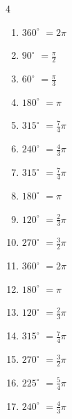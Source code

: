 \begin{multicols}{4}
\begin{enumerate}
\columnbreak %

  \item $\displaystyle 360^{\circ}$
        $\displaystyle =2\pi$

  \item $\displaystyle 90^{\circ}$
        $\displaystyle =\frac{\pi}{2}$

  \item $\displaystyle 60^{\circ}$
        $\displaystyle =\frac{\pi}{3}$

  \item $\displaystyle 180^{\circ}$
        $\displaystyle =\pi$

  \item $\displaystyle 315^{\circ}$
        $\displaystyle =\frac{7}{4}\pi$

  \item $\displaystyle 240^{\circ}$
        $\displaystyle =\frac{4}{3}\pi$

  \item $\displaystyle 315^{\circ}$
        $\displaystyle =\frac{7}{4}\pi$

  \item $\displaystyle 180^{\circ}$
        $\displaystyle =\pi$

  \item $\displaystyle 120^{\circ}$
        $\displaystyle =\frac{2}{3}\pi$

  \item $\displaystyle 270^{\circ}$
        $\displaystyle =\frac{3}{2}\pi$

  \item $\displaystyle 360^{\circ}$
        $\displaystyle =2\pi$

  \item $\displaystyle 180^{\circ}$
        $\displaystyle =\pi$

  \item $\displaystyle 120^{\circ}$
        $\displaystyle =\frac{2}{3}\pi$

  \item $\displaystyle 315^{\circ}$
        $\displaystyle =\frac{7}{4}\pi$

  \item $\displaystyle 270^{\circ}$
        $\displaystyle =\frac{3}{2}\pi$

  \item $\displaystyle 225^{\circ}$
        $\displaystyle =\frac{5}{4}\pi$

  \item $\displaystyle 240^{\circ}$
        $\displaystyle =\frac{4}{3}\pi$


\end{enumerate}
\end{multicols}
